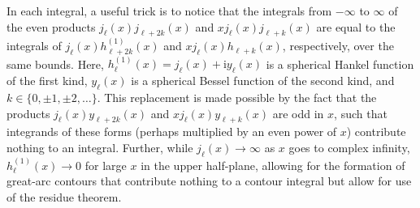 In each integral, a useful trick is to notice that the integrals from $-\infty$ to $\infty$ of the even products $j_\ell(x)j_{\ell + 2k}(x)$ and $xj_\ell(x)j_{\ell + k}(x)$ are equal to the integrals of $j_\ell(x)h_{\ell + 2k}^{(1)}(x)$ and $xj_\ell(x)h_{\ell + k}(x)$, respectively, over the same bounds. Here, $h_{\ell}^{(1)}(x) = j_\ell(x) + \mathrm{i}y_\ell(x)$ is a spherical Hankel function of the first kind, $y_\ell(x)$ is a spherical Bessel function of the second kind, and $k \in\{0,\pm1,\pm2,\ldots\}$. This replacement is made possible by the fact that the products $j_\ell(x)y_{\ell + 2k}(x)$ and $xj_\ell(x)y_{\ell + k}(x)$ are odd in $x$, such that integrands of these forms (perhaps multiplied by an even power of $x$) contribute nothing to an integral. Further, while $j_\ell(x)\to\infty$ as $x$ goes to complex infinity, $h_{\ell}^{(1)}(x)\to0$ for large $x$ in the upper half-plane, allowing for the formation of great-arc contours that contribute nothing to a contour integral but allow for use of the residue theorem.


